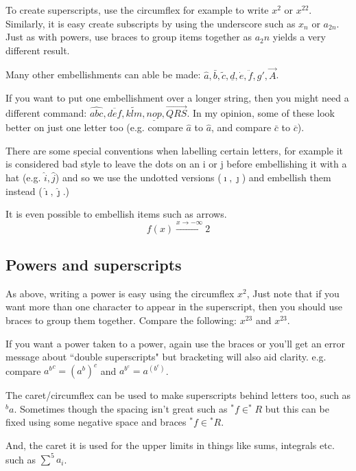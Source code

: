 \documentclass[a4paper,11pt]{article}
\begin{document}
To create superscripts, use the circumflex for example to write $x^2$ or $x^{22}$. Similarly, it is easy create subscripts by using the underscore such as $x_n$ or $a_{2n}$. Just as with powers, use braces to group items together as $a_2n$ yields a very different result. 

Many other embellishments can able be made: $\hat{a}, \bar{b}, \tilde{c},  \underline{d}, \dot{e}, \ddot{f}, g',  \overrightarrow{A}$.

If you want to put one embellishment over a longer string, then you might need a different command: $\widehat{abc},  \overline{def}, \widetilde{klm}, \underline{nop},  \overrightarrow{QRS}$. In my opinion, some of these look better on just one letter too (e.g. compare $\hat{a}$ to $\widehat{a}$, and compare $\bar{c}$ to $\overline{c}$).

There are some special conventions when labelling certain letters, for example it is considered bad style to leave the dots on an i or j before embellishing it with a hat (e.g. $\hat{i}, \hat{j}$) and so we use the undotted versions ($\imath, \jmath$) and embellish them instead ($\hat{\imath}, \hat{\jmath}$.)

It is even possible to embellish items such as arrows. 
\[ 
f(x) \xrightarrow{x \to -\infty} 2
\]

\subsection{Powers and superscripts}

As above, writing a power is easy using the circumflex $x^2$, Just note that if you want more than one character to appear in the superscript, then you should use braces to group them together. 
Compare the following: $x^23$ and $x^{23}$.

If you want a power taken to a power, again use the braces or you'll get an error message about ``double superscripts" but bracketing will also aid clarity. e.g. compare ${a^b}^c = {(a^b)}^c$ and $a^{b^c}=a^{(b^c)}$.
 
The caret/circumflex can be used to make superscripts behind letters too, such as $^b a$. Sometimes though the spacing isn't great such as $^*f \in ^*R$ 
but this can be fixed using some negative space and braces ${}^*\!f \in {}^*\!R$.

And, the caret it is used for the upper limits in things like sums, integrals etc. such as $\sum^5 a_i$.
\end{document}
